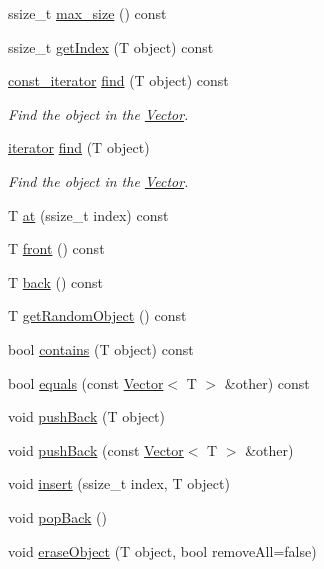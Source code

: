 \begin{DoxyCompactItemize}
ssize\+\_\+t \hyperlink{classVector_ab10488a501e7d2073faf8d729fc1d416}{max\+\_\+size} () const
\item 
ssize\+\_\+t \hyperlink{classVector_a21b8c98af0c86216bdee67ec581abc13}{get\+Index} (T object) const
\item 
\hyperlink{classVector_a484e934cc06bb84c7d70042e792b6e55}{const\+\_\+iterator} \hyperlink{classVector_a9ae8f35e4ea3ec88ebeda0b20bcf7d35}{find} (T object) const
\begin{DoxyCompactList}\small\item\em Find the object in the \hyperlink{classVector}{Vector}. \end{DoxyCompactList}\item 
\hyperlink{classVector_a45531016f99e90887e0f890f2da943e4}{iterator} \hyperlink{classVector_a0cc9f44b2dfb2431e36479badc0f22ff}{find} (T object)
\begin{DoxyCompactList}\small\item\em Find the object in the \hyperlink{classVector}{Vector}. \end{DoxyCompactList}\item 
T \hyperlink{classVector_a18868cf17d22de86d3f5a0569d774d2e}{at} (ssize\+\_\+t index) const
\item 
T \hyperlink{classVector_a237ab21eb5459aa729d157c27606725d}{front} () const
\item 
T \hyperlink{classVector_a50880f90b629b19db48d8fa13adbe7ec}{back} () const
\item 
T \hyperlink{classVector_a1d3180f23d1c9cfcbd5d8c9414f08ac8}{get\+Random\+Object} () const
\item 
bool \hyperlink{classVector_a20b0a89d6e0ee21d07315121867d84ef}{contains} (T object) const
\item 
bool \hyperlink{classVector_a3c4d1a9ee0630cf85060a79551e29144}{equals} (const \hyperlink{classVector}{Vector}$<$ T $>$ \&other) const
\item 
void \hyperlink{classVector_a3fa393713cf34ed2ad97538f866f09e7}{push\+Back} (T object)
\item 
void \hyperlink{classVector_abf8b935246cbe7710aabf8e1f3e63952}{push\+Back} (const \hyperlink{classVector}{Vector}$<$ T $>$ \&other)
\item 
void \hyperlink{classVector_af26422bc96ef24de9752fc17270084b3}{insert} (ssize\+\_\+t index, T object)
\item 
void \hyperlink{classVector_a91c45b15e4cff53bad3628b75382793f}{pop\+Back} ()
\item 
void \hyperlink{classVector_a068bbab154b844cea8a7013bf12f30b3}{erase\+Object} (T object, bool remove\+All=false)

\end{DoxyCompactItemize}
